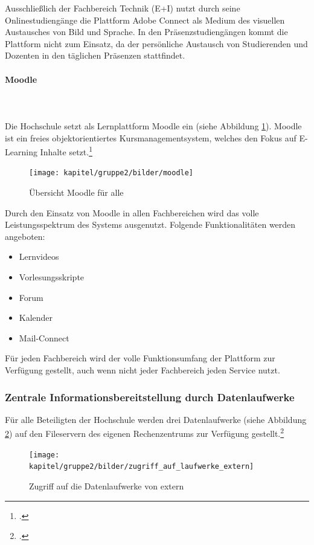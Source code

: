 Ausschließlich der Fachbereich Technik (E+I) nutzt durch seine Onlinestudiengänge die Plattform Adobe Connect als Medium des visuellen Austausches von Bild und Sprache. In den Präsenzstudiengängen kommt die Plattform nicht zum Einsatz, da der persönliche Austausch von Studierenden und Dozenten in den täglichen Präsenzen stattfindet.
\newpage
\paragraph{Moodle}\mbox{}\\\\
\label{paragraph_moodle}
Die Hochschule setzt als Lernplattform Moodle ein (siehe Abbildung \ref{fig_moodle}). Moodle ist ein freies objektorientiertes Kursmanagementsystem, welches den Fokus auf E-Learning Inhalte setzt.\footcite{hsel_moodle_2015}

\begin{figure}[h!]
	\centering
	\texttt{[image: kapitel/gruppe2/bilder/moodle]}
	\caption{Übersicht Moodle für alle\protect\footnotemark}
	\label{fig_moodle}
\end{figure}


Durch den Einsatz von Moodle in allen Fachbereichen wird das volle Leistungsspektrum des Systems ausgenutzt. Folgende Funktionalitäten werden angeboten:

\begin{itemize}
	\item Lernvideos
	\item Vorlesungsskripte
	\item Forum
	\item Kalender
	\item Mail-Connect
\end{itemize}

Für jeden Fachbereich wird der volle Funktionsumfang der Plattform zur Verfügung gestellt, auch wenn nicht jeder Fachbereich jeden Service nutzt. 
\newpage
\subsubsection{Zentrale Informationsbereitstellung durch Datenlaufwerke}
\label{zentrale_Datenlaufwerke}
Für alle Beteiligten der Hochschule werden drei Datenlaufwerke (siehe Abbildung \ref{fig_zugriff_datenlaufwerke_extern}) auf den Fileservern des eigenen Rechenzentrums zur Verfügung gestellt.\footcite{hsel_moodle_welcome_2015}

\begin{figure}[h]
	\centering
	\texttt{[image: kapitel/gruppe2/bilder/zugriff\_auf\_laufwerke\_extern]}
	\caption{Zugriff auf die Datenlaufwerke von extern \protect\footnotemark}
	\label{fig_zugriff_datenlaufwerke_extern}
\end{figure}

